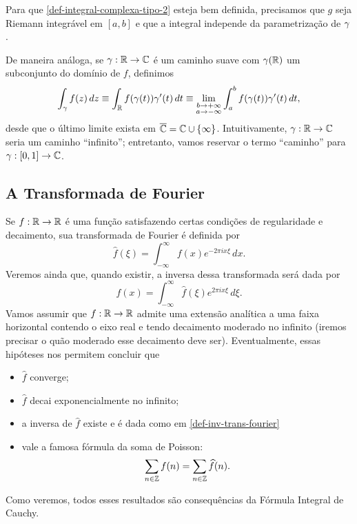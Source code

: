         Para que \eqref{def-integral-complexa-tipo-2} esteja bem definida, precisamos que
        $g$ seja Riemann integrável em $[a,b]$ e que a integral independe da parametrização
        de $\gamma$.
        
        De maneira análoga, se $\gamma:\mathbb{R}\to\mathbb{C}$ é um caminho suave com $\gamma(\mathbb{R})$ um
        subconjunto do domínio de $f$, definimos
        \begin{align*}
            \int_{\gamma} f(z) \, dz \equiv \int_{\mathbb{R}} f(\gamma(t))\gamma'(t) \, dt
                                     \equiv \lim_{\substack{b\to +\infty \\ a\to -\infty}} 
                                     \int_a^b f(\gamma(t))\gamma'(t) \, dt,
        \end{align*}
        desde que o último limite exista em $\overline{\mathbb{C}} = \mathbb{C}\cup\{\infty\}$. Intuitivamente,
        $\gamma:\mathbb{R}\to\mathbb{C}$ seria um caminho ``infinito''; entretanto, vamos reservar o termo ``caminho''
        para $\gamma:[0,1]\to\mathbb{C}$.
        
    \subsection{A Transformada de Fourier}
        Se $f:\mathbb{R}\to\mathbb{R}$ é uma função satisfazendo certas condições de regularidade e decaimento,
        sua transformada de Fourier é definida por
        \begin{equation}
        \label{def-transf-fourier}
            \widehat{f}(\xi) = \int_{-\infty}^{\infty} f(x) e^{-2\pi ix\xi} \, dx.
        \end{equation}
        Veremos ainda que, quando existir, a inversa dessa transformada será dada por
        \begin{equation}
        \label{def-inv-trans-fourier}
            f(x) = \int_{-\infty}^{\infty} \widehat{f}(\xi) e^{2\pi ix\xi} \, d\xi.
        \end{equation}
        Vamos assumir que $f:\mathbb{R}\to\mathbb{R}$ admite uma extensão analítica a uma faixa horizontal contendo
        o eixo real e tendo decaimento moderado no infinito (iremos precisar o quão
        moderado esse decaimento deve ser). Eventualmente, essas hipóteses
        nos permitem concluir que
        \begin{itemize}
            \item $\widehat{f}$ converge;
            \item $\widehat{f}$ decai exponencialmente no infinito;
            \item a inversa de $\widehat{f}$ existe e é dada como em \eqref{def-inv-trans-fourier}
            \item vale a famosa fórmula da soma de Poisson:
            \begin{equation}
            \label{def-soma-poisson}
                \sum_{n\in\mathbb{Z}} f(n) = \sum_{n\in\mathbb{Z}} \widehat{f}(n).
            \end{equation}
        \end{itemize}
        Como veremos, todos esses resultados são consequências da Fórmula Integral de Cauchy.
        
